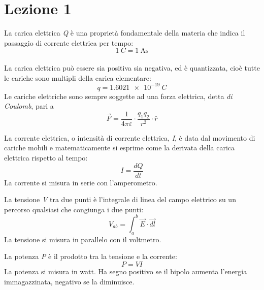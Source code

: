 \section{Lezione 1}

\begin{defn}
	La carica elettrica \emph{Q} è una proprietà fondamentale della materia che indica il passaggio di corrente elettrica per tempo: $$ \SI{1}{C} = \SI{1}{\ampere\second} $$ \\
	La carica elettrica può essere sia positiva sia negativa, ed è quantizzata, cioè tutte le cariche sono multipli della carica elementare: $$ q = \SI{1.6021e-19}{C} $$  
	Le cariche elettriche sono sempre soggette ad una forza elettrica, detta \emph{di Coulomb}, pari a $$ \vec{F} = \frac{1}{4\pi\varepsilon} \cdot \frac{q_1 q_2}{r^2} \cdot \hat{r} $$
\end{defn}

\begin{defn}
	La corrente elettrica, o intensità di corrente elettrica, \emph{I}, è data dal movimento di cariche mobili e matematicamente si esprime come la derivata della carica elettrica rispetto al tempo: $$ I = \frac{dQ}{dt} $$
	La corrente si misura in serie con l'amperometro.
\end{defn}

\begin{defn}
	La tensione \emph{V} tra due punti è l'integrale di linea del campo elettrico su un percorso qualsiasi che congiunga i due punti: $$ V_{ab} = \int_a^b \vec{E} \cdot \vec{dl} $$
	La tensione si misura in parallelo con il voltmetro.
\end{defn}

\begin{defn}[Potenza]
	La potenza \emph{P} è il prodotto tra la tensione e la corrente: $$ P = V I $$
	La potenza si misura in watt. Ha segno positivo se il bipolo aumenta l'energia immagazzinata, negativo se la diminuisce.
\end{defn}

